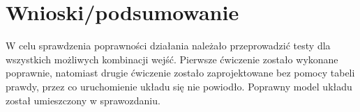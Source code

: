 \documentclass[12pt,a4paper]{article}
\begin{document}
	\section{Wnioski/podsumowanie}
	
			W celu sprawdzenia poprawności działania należało przeprowadzić testy dla wszystkich możliwych kombinacji wejść. Pierwsze ćwiczenie zostało wykonane poprawnie, natomiast drugie ćwiczenie zostało zaprojektowane bez pomocy tabeli prawdy, przez co uruchomienie układu się nie powiodło. Poprawny model układu został umieszczony w sprawozdaniu.
	
\end{document}
